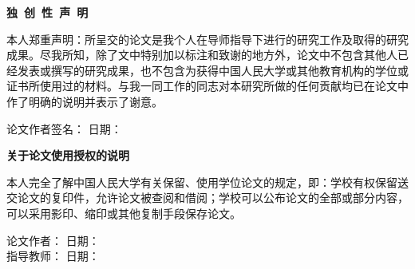 \documentclass[UTF8, a4paper, zihao=-4]{ctexart} %
\numberwithin{equation}{section}%
\begin{document}
\begin{titlepage}
    \centering
    { \bfseries 独\ 创\ 性\ 声\ 明} \\
    \vspace{1cm}
    \begin{flushleft}
    \hspace{2em}本人郑重声明：所呈交的论文是我个人在导师指导下进行的研究工作及取得的研究成果。尽我所知，除了文中特别加以标注和致谢的地方外，论文中不包含其他人已经发表或撰写的研究成果，也不包含为获得中国人民大学或其他教育机构的学位或证书所使用过的材料。与我一同工作的同志对本研究所做的任何贡献均已在论文中作了明确的说明并表示了谢意。 
    \end{flushleft}
    \vspace{1cm}
    \begin{flushright}
        论文作者签名：\underline{\makebox[4cm]{}} \quad 日期：\underline{\makebox[3cm]{}}
    \end{flushright}
    
    \vspace{2cm}
    
    { \bfseries 关于论文使用授权的说明} \\
    \vspace{1cm}
    \begin{flushleft}
    \hspace{2em}本人完全了解中国人民大学有关保留、使用学位论文的规定，即：学校有权保留送交论文的复印件，允许论文被查阅和借阅；学校可以公布论文的全部或部分内容，可以采用影印、缩印或其他复制手段保存论文。 
    \end{flushleft}
    \vspace{1cm}
    \begin{flushright}
        论文作者：\underline{\makebox[4cm]{}} 
        \quad 日期：\underline{\makebox[3cm]{}} \\
        \vspace{0.5cm} 指导教师：\underline{\makebox[4cm]{}} \quad 日期：\underline{\makebox[3cm]{}}
    \end{flushright}
\end{titlepage}

\newpage

\end{document}
